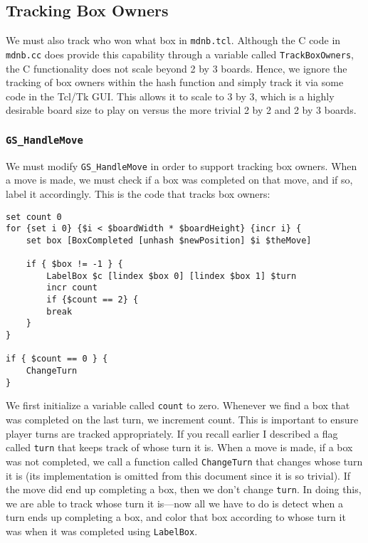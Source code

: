 \documentclass{article}
\begin{document}
\subsection{Tracking Box Owners}

We must also track who won what box in \texttt{mdnb.tcl}. Although the C code in \texttt{mdnb.cc} does provide this capability through a variable called \texttt{TrackBoxOwners}, the C functionality does not scale beyond 2 by 3 boards. Hence, we ignore the tracking of box owners within the hash function and simply track it via some code in the Tcl/Tk GUI. This allows it to scale to 3 by 3, which is a highly desirable board size to play on versus the more trivial 2 by 2 and 2 by 3 boards.

\subsubsection{\texttt{GS\_HandleMove}}

We must modify \texttt{GS\_HandleMove} in order to support tracking box owners. When a move is made, we must check if a box was completed on that move, and if so, label it accordingly. This is the code that tracks box owners:

\begin{verbatim}
set count 0
for {set i 0} {$i < $boardWidth * $boardHeight} {incr i} {
    set box [BoxCompleted [unhash $newPosition] $i $theMove]

    if { $box != -1 } {
        LabelBox $c [lindex $box 0] [lindex $box 1] $turn
        incr count
        if {$count == 2} {
        break
    }
}

if { $count == 0 } {
    ChangeTurn
}
\end{verbatim}

We first initialize a variable called \texttt{count} to zero. Whenever we find a box that was completed on the last turn, we increment count. This is important to ensure player turns are tracked appropriately. If you recall earlier I described a flag called \texttt{turn} that keeps track of whose turn it is. When a move is made, if a box was not completed, we call a function called \texttt{ChangeTurn} that changes whose turn it is (its implementation is omitted from this document since it is so trivial). If the move did end up completing a box, then we don't change \texttt{turn}. In doing this, we are able to track whose turn it is---now all we have to do is detect when a turn ends up completing a box, and color that box according to whose turn it was when it was completed using \texttt{LabelBox}.
\end{document}
